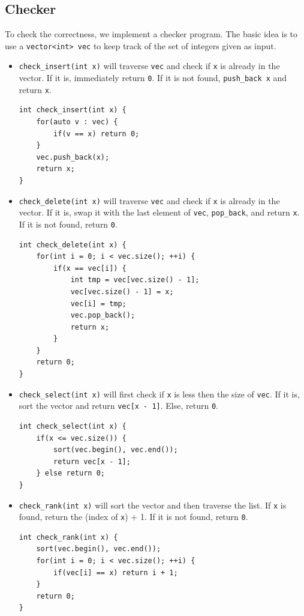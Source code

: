 \documentclass[12pt]{article}
\begin{document}
\subsection{Checker}
To check the correctness, we implement a checker program. The basic idea is to use a \texttt{vector<int> vec} to keep track of the set of integers given as input.
\begin{itemize}
	\item \texttt{check\_insert(int x)} will traverse \texttt{vec} and check if \texttt{x} is already in the vector. If it is, immediately return \texttt{0}. If it is not found, \texttt{push\_back x} and return \texttt{x}.
\begin{lstlisting}[style=Cstyle]
int check_insert(int x) {
	for(auto v : vec) {
		if(v == x) return 0;
	}
	vec.push_back(x);
	return x;
}
\end{lstlisting} 
	\item \texttt{check\_delete(int x)} will traverse \texttt{vec} and check if \texttt{x} is already in the vector. If it is, swap it with the last element of \texttt{vec}, \texttt{pop\_back}, and return \texttt{x}. If it is not found, return \texttt{0}.
\begin{lstlisting}[style=Cstyle]
int check_delete(int x) {
	for(int i = 0; i < vec.size(); ++i) {
		if(x == vec[i]) {
			int tmp = vec[vec.size() - 1];
			vec[vec.size() - 1] = x;
			vec[i] = tmp;
			vec.pop_back();
			return x;
		}
	}
	return 0;
}
\end{lstlisting}

\item \texttt{check\_select(int x)} will first check if \texttt{x} is less then the size of \texttt{vec}. If it is, sort the vector and return \texttt{vec[x - 1]}. Else, return \texttt{0}.
\begin{lstlisting}[style=Cstyle]
int check_select(int x) {
	if(x <= vec.size()) {
		sort(vec.begin(), vec.end());
		return vec[x - 1];
	} else return 0;
}
\end{lstlisting}

\item \texttt{check\_rank(int x)} will sort the vector and then traverse the list. If \texttt{x} is found, return the (index of \texttt{x}) + 1. If it is not found, return \texttt{0}.
\begin{lstlisting}[style=Cstyle]
int check_rank(int x) {
	sort(vec.begin(), vec.end());
	for(int i = 0; i < vec.size(); ++i) {
		if(vec[i] == x) return i + 1;
	}
	return 0;
}

\end{lstlisting}
\end{itemize}
\end{document}
